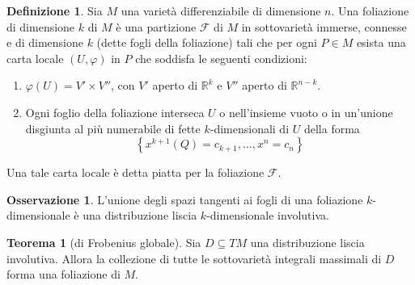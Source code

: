 \documentclass[a4paper,11pt]{article}
\theoremstyle{definition}
\newtheorem{osservazione}{Osservazione}[section]
\newtheorem{definizione}{Definizione}[section]
\theoremstyle{theorem}
\newtheorem{teorema}{Teorema}[section]
\newcommand{\R}{\mathbb{R}}
\begin{document}
\begin{definizione}
	Sia $M$ una varietà differenziabile di dimensione $n$. Una foliazione di dimensione $k$ di $M$ è una partizione $\mathcal{F}$ di $M$ in sottovarietà immerse, connesse e di dimensione $k$ (dette fogli della foliazione) tali che per ogni $P\in M$ esista una carta locale $(U,\varphi)$ in $P$ che soddisfa le seguenti condizioni:
	\begin{enumerate}
		\item $\varphi(U)=V'\times V''$, con $V'$ aperto di $\R^k$ e $V''$ aperto di $\R^{n-k}$.
		\item Ogni foglio della foliazione interseca $U$ o nell'insieme vuoto o in un'unione disgiunta al più numerabile di fette $k$-dimensionali di $U$ della forma
		\[\left\{x^{k+1}(Q)=c_{k+1},\dots,x^n=c_n\right\}\]
	\end{enumerate}
	Una tale carta locale è detta piatta per la foliazione $\mathcal{F}$.
\end{definizione}
\begin{osservazione}
	L'unione degli spazi tangenti ai fogli di una foliazione $k$-dimensionale è una distribuzione liscia $k$-dimensionale involutiva.
\end{osservazione}
\begin{teorema}[di Frobenius globale]
	Sia $D\subseteq TM$ una distribuzione liscia involutiva. Allora la collezione di tutte le sottovarietà integrali massimali di $D$ forma una foliazione di $M$.
\end{teorema}
\end{document}
